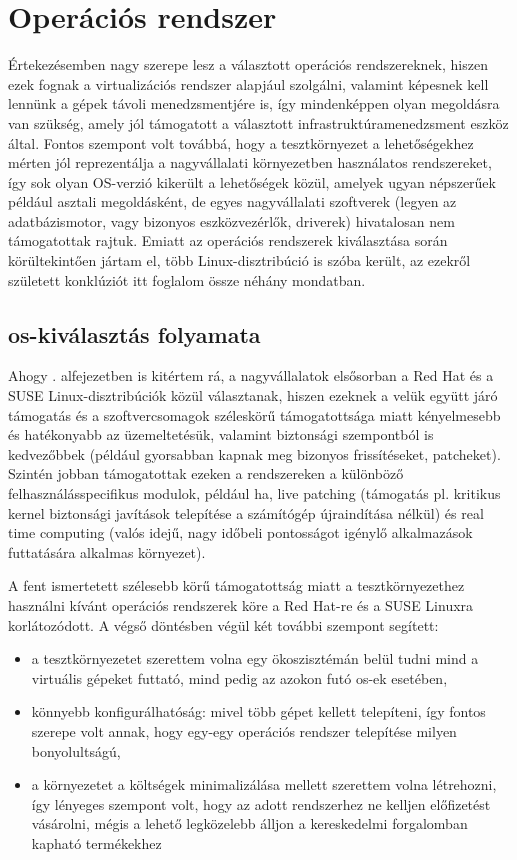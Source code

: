 \section{Operációs rendszer}
Értekezésemben nagy szerepe lesz a választott operációs rendszereknek, hiszen ezek fognak a virtualizációs rendszer alapjául szolgálni, valamint képesnek kell lennünk a gépek távoli menedzsmentjére is, így mindenképpen olyan megoldásra van szükség, amely jól támogatott a választott infrastruktúramenedzsment eszköz által. Fontos szempont volt továbbá, hogy a tesztkörnyezet a lehetőségekhez mérten jól reprezentálja a nagyvállalati környezetben használatos rendszereket, így sok olyan OS-verzió kikerült a lehetőségek közül, amelyek ugyan népszerűek például asztali megoldásként, de egyes nagyvállalati szoftverek (legyen az adatbázismotor, vagy bizonyos eszközvezérlők, driverek) hivatalosan nem támogatottak rajtuk. Emiatt az operációs rendszerek kiválasztása során körültekintően jártam el, több Linux-disztribúció is szóba került, az ezekről született konklúziót itt foglalom össze néhány mondatban.

\subsection{\acrshort{os}-kiválasztás folyamata}
Ahogy . alfejezetben is kitértem rá, a nagyvállalatok elsősorban a Red Hat és a SUSE Linux-disztribúciók közül választanak, hiszen ezeknek a velük együtt járó támogatás és a szoftvercsomagok széleskörű támogatottsága miatt kényelmesebb és hatékonyabb az üzemeltetésük, valamint biztonsági szempontból is kedvezőbbek (például gyorsabban kapnak meg bizonyos frissítéseket, patcheket). Szintén jobban támogatottak ezeken a rendszereken a különböző felhasználásspecifikus modulok, például \acrfull{ha}, live patching (támogatás pl. kritikus kernel biztonsági javítások telepítése a számítógép újraindítása nélkül) és real time computing (valós idejű, nagy időbeli pontosságot igénylő alkalmazások futtatására alkalmas környezet).

A fent ismertetett szélesebb körű támogatottság miatt a tesztkörnyezethez használni kívánt operációs rendszerek köre a Red Hat-re és a SUSE Linuxra korlátozódott. A végső döntésben végül két további szempont segített: 
\begin{itemize}
	\item a tesztkörnyezetet szerettem volna egy ökoszisztémán belül tudni mind a virtuális gépeket futtató, mind pedig az azokon futó \acrshort{os}-ek esetében,
	\item könnyebb konfigurálhatóság: mivel több gépet kellett telepíteni, így fontos szerepe volt annak, hogy egy-egy operációs rendszer telepítése milyen bonyolultságú,
	\item a környezetet a költségek minimalizálása mellett szerettem volna létrehozni, így lényeges szempont volt, hogy az adott rendszerhez ne kelljen előfizetést vásárolni, mégis a lehető legközelebb álljon a kereskedelmi forgalomban kapható termékekhez
\end{itemize}

